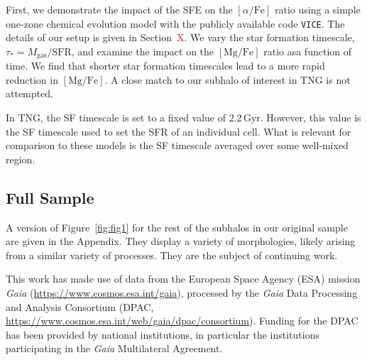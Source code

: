 \documentclass[linenumbers, twocolumn]{aastex631}
\newcommand{\Gyr}{\ensuremath{\textrm{Gyr}}}
\newcommand{\MgFe}{\ensuremath{[\textrm{Mg}/\textrm{Fe}]}}
\newcommand{\alphaFe}{\ensuremath{[\alpha/\textrm{Fe}]}}
\newcommand{\red}[1]{\textcolor{red}{#1}}
\begin{document}
First, we demonstrate the impact of the SFE on the \alphaFe{} ratio using a simple one-zone chemical evolution model with the publicly available code \texttt{VICE}. The details of our setup is given in Section~\red{X}. We vary the star formation timescale, $\tau_{*}=M_{\textrm{gas}}/\textrm{SFR}$, and examine the impact on the \MgFe{} ratio asa function of time. We find that shorter star formation timescales lead to a more rapid reduction in \MgFe{}. A close match to our subhalo of interest in TNG is not attempted.

In TNG, the SF timescale is set to a fixed value of $2.2\,\Gyr$. However, this value is the SF timescale used to set the SFR of an individual cell. What is relevant for comparison to these models is the SF timescale averaged over some well-mixed region. 

\subsection{Full Sample}\label{ssec:fullsamp}

A version of Figure~\ref{fig:fig1} for the rest of the subhalos in our original sample are given in the Appendix. They display a variety of morphologies, likely arising from a similar variety of processes. They are the subject of continuing work.



\begin{acknowledgements}
This work has made use of data from the European Space Agency (ESA) mission {\it Gaia} (\url{https://www.cosmos.esa.int/gaia}), processed by the {\it Gaia} Data Processing and Analysis Consortium (DPAC, \url{https://www.cosmos.esa.int/web/gaia/dpac/consortium}). Funding for the DPAC has been provided by national institutions, in particular the institutions participating in the {\it Gaia} Multilateral Agreement.
\end{acknowledgements}

{}


% 
\end{document}
